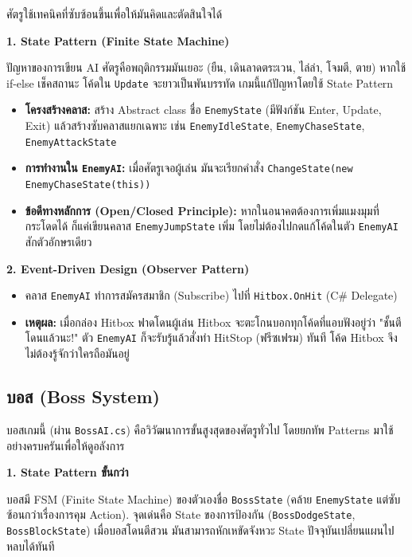 ศัตรูใช้เทคนิคที่ซับซ้อนขึ้นเพื่อให้มันคิดและตัดสินใจได้

\textbf{1. State Pattern (Finite State Machine)}

ปัญหาของการเขียน AI ศัตรูคือพฤติกรรมมันเยอะ (ยืน, เดินลาดตระเวน, ไล่ล่า, โจมตี, ตาย) หากใช้ if-else เช็คสถานะ โค้ดใน \texttt{Update} จะยาวเป็นพันบรรทัด เกมนี้แก้ปัญหาโดยใช้ State Pattern

\begin{itemize}
\item \textbf{โครงสร้างคลาส:} สร้าง Abstract class ชื่อ \texttt{EnemyState} (มีฟังก์ชัน Enter, Update, Exit) แล้วสร้างซับคลาสแยกเฉพาะ เช่น \texttt{EnemyIdleState}, \texttt{EnemyChaseState}, \texttt{EnemyAttackState}
\item \textbf{การทำงานใน \texttt{EnemyAI}:} เมื่อศัตรูเจอผู้เล่น มันจะเรียกคำสั่ง \texttt{ChangeState(new EnemyChaseState(this))}
\item \textbf{ข้อดีทางหลักการ (Open/Closed Principle):} หากในอนาคตต้องการเพิ่มแมงมุมที่กระโดดได้ ก็แค่เขียนคลาส \texttt{EnemyJumpState} เพิ่ม โดยไม่ต้องไปกดแก้โค้ดในตัว \texttt{EnemyAI} สักตัวอักษรเดียว
\end{itemize}

\textbf{2. Event-Driven Design (Observer Pattern)}

\begin{itemize}
\item คลาส \texttt{EnemyAI} ทำการสมัครสมาชิก (Subscribe) ไปที่ \texttt{Hitbox.OnHit} (C\# Delegate)
\item \textbf{เหตุผล:} เมื่อกล่อง Hitbox ฟาดโดนผู้เล่น Hitbox จะตะโกนบอกทุกโค้ดที่แอบฟังอยู่ว่า "ชั้นตีโดนแล้วนะ!" ตัว \texttt{EnemyAI} ก็จะรับรู้แล้วสั่งทำ HitStop (ฟรีซเฟรม) ทันที โค้ด Hitbox จึงไม่ต้องรู้จักว่าใครถือมันอยู่
\end{itemize}

\subsection{บอส (Boss System)}

บอสเกมนี้ (ผ่าน \texttt{BossAI.cs}) คือวิวัฒนาการขั้นสูงสุดของศัตรูทั่วไป โดยยกทัพ Patterns มาใช้อย่างครบครันเพื่อให้ดูอลังการ

\textbf{1. State Pattern ขั้นกว่า}

บอสมี FSM (Finite State Machine) ของตัวเองชื่อ \texttt{BossState} (คล้าย \texttt{EnemyState} แต่ซับซ้อนกว่าเรื่องการคุม Action). จุดเด่นคือ State ของการป้องกัน (\texttt{BossDodgeState}, \texttt{BossBlockState}) เมื่อบอสโดนตีสวน มันสามารถหักเหขัดจังหวะ State ปัจจุบันเปลี่ยนแผนไปหลบได้ทันที

